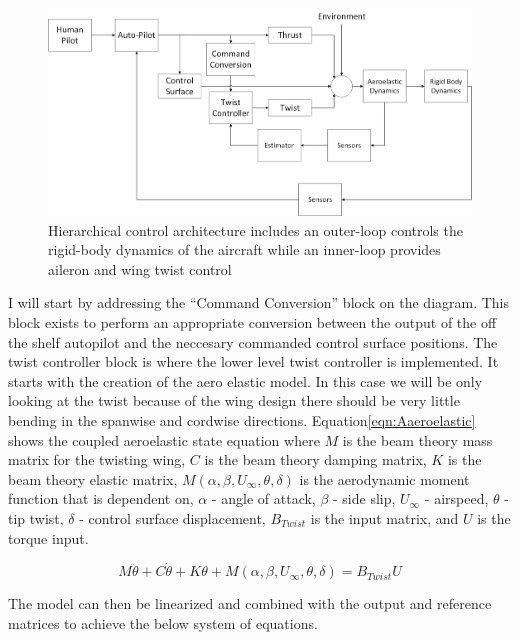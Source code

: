 \documentclass[11pt]{ucthesis}
\begin{document}
\begin{figure}[h]
\centering
\includegraphics[width=1\linewidth]{Figures/Phase1Control.png}
\caption{Hierarchical control architecture includes an outer-loop controls the rigid-body dynamics of the aircraft while an inner-loop provides aileron and wing twist control}
\label{fig:AControlBlockDiag}
\end{figure}

I will start by addressing the ``Command Conversion'' block on the diagram. This block exists to perform an appropriate conversion between the output of the off the shelf autopilot and the neccesary commanded control surface positions. The twist controller block is where the lower level twist controller is implemented. It starts with the creation of the aero elastic model. In this case we will be only looking at the twist because of the wing design there should be very little bending in the spanwise and cordwise directions. Equation\ref{eqn:Aaeroelastic} shows the coupled aeroelastic state equation where $M$ is the beam theory mass matrix for the twisting wing, $C$ is the beam theory damping matrix, $K$ is the beam theory elastic matrix, $M(\alpha,\beta,U_{\infty},\theta,\delta)$ is the aerodynamic moment function that is dependent on, $\alpha$ - angle of attack, $\beta$ - side slip, $U_{\infty}$ - airspeed, $\theta$ - tip twist, $\delta$ - control surface displacement, $B_{Twist}$ is the input matrix, and $U$ is the torque input.

\begin{equation}
M \ddot{\theta} + C \dot{\theta} +K\theta+M(\alpha,\beta,U_{\infty},\theta,\delta) = B_{Twist}U
\label{eqn:Aaeroelastic}
\end{equation}

The model can then be linearized and combined with the output and reference matrices to achieve the below system of equations.
\end{document}
